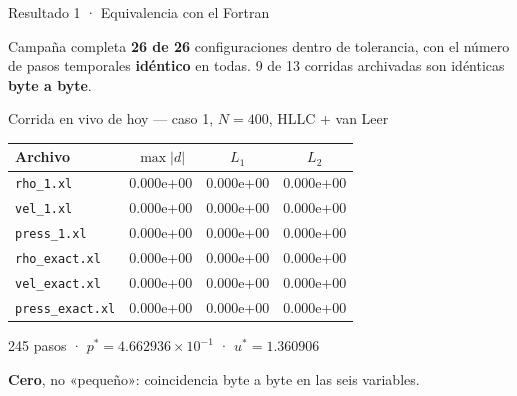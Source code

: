 \documentclass[aspectratio=169,10pt]{beamer}
\newcommand{\cod}[1]{\texttt{\small #1}}
\begin{document}
\begin{frame}[shrink]{Resultado 1 · Equivalencia con el Fortran}

  \begin{block}{Campaña completa}
    \small
    \textbf{26 de 26} configuraciones dentro de tolerancia, con el número de pasos
    temporales \textbf{idéntico} en todas. 9 de 13 corridas archivadas son
    idénticas \textbf{byte a byte}.
  \end{block}

  \begin{exampleblock}{Corrida en vivo de hoy — caso 1, $N=400$, HLLC + van Leer}
    \centering\scriptsize
    \begin{tabular}{@{}lccc@{}}
      \toprule
      \textbf{Archivo} & $\max|d|$ & $L_1$ & $L_2$ \\
      \midrule
      \cod{rho\_1.xl}       & 0.000e+00 & 0.000e+00 & 0.000e+00 \\
      \cod{vel\_1.xl}       & 0.000e+00 & 0.000e+00 & 0.000e+00 \\
      \cod{press\_1.xl}     & 0.000e+00 & 0.000e+00 & 0.000e+00 \\
      \cod{rho\_exact.xl}   & 0.000e+00 & 0.000e+00 & 0.000e+00 \\
      \cod{vel\_exact.xl}   & 0.000e+00 & 0.000e+00 & 0.000e+00 \\
      \cod{press\_exact.xl} & 0.000e+00 & 0.000e+00 & 0.000e+00 \\
      \bottomrule
    \end{tabular}

    \vspace{0.3em}
    \scriptsize 245 pasos · $p^*=4.662936\times10^{-1}$ · $u^*=1.360906$
  \end{exampleblock}

  \begin{center}
    \small
    \textbf{Cero}, no «pequeño»: coincidencia byte a byte en las seis variables.
  \end{center}
\end{frame}
\end{document}
